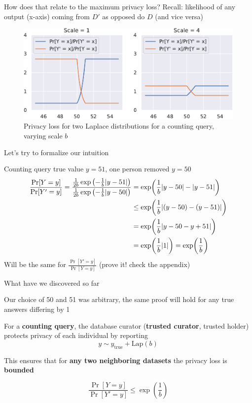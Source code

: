 \documentclass[12pt,aspectratio=169,handout]{beamer}
\begin{document}
\begin{frame}{How does that relate to the maximum privacy loss?}
Recall: likelihood of any output (x-axis) coming from $D'$ as opposed do $D$ (and vice versa)

\begin{figure}
\centering
\includegraphics[width=0.8\linewidth]{img/privacy-loss1.pdf}
\caption{Privacy loss for two Laplace distributions for a counting query, varying scale $b$}
\end{figure}

\end{frame}



\begin{frame}{Let's try to formalize our intuition}
\label{slide:proof.reference}

Counting query true value $y= 51$, one person removed $y = 50$
$$
\begin{aligned}
\frac{\Pr[Y = y]}{\Pr[Y' = y]} =
\frac{
\frac{1}{2b} \exp \left(- \frac{1}{b} \abs{y - 51} \right)
}{
\frac{1}{2b} \exp \left(- \frac{1}{b} \abs{y - 50} \right) 
}
&= \exp (\frac{1}{b} \abs{y - 50} - \abs{y - 51} ) \\
&\leq \exp (\frac{1}{b} \abs{(y - 50) - (y - 51)} ) \\
&= \exp (\frac{1}{b} \abs{y - 50 - y + 51} ) \\
&= \exp (\frac{1}{b} \abs{1}) = \exp(\frac{1}{b}) \\
\end{aligned}
$$
Will be the same for $\frac{\Pr[Y' = y]}{\Pr[Y = y]}$ (prove it! check the appendix)

\end{frame}







\begin{frame}{What have we discovered so far}

Our choice of 50 and 51 was arbitrary, the same proof will hold for any true answers differing by 1

For a \textbf{counting query}, the database curator (\textbf{trusted curator}, trusted holder) protects privacy of each individual by reporting
$$y \sim y_{\mathrm{true}} + \textrm{Lap}(b)$$

This ensures that for \textbf{any two neighboring datasets} the privacy loss is \textbf{bounded}

$$
\frac{\Pr[Y = y]}{\Pr[Y' = y]} \leq \exp(\frac{1}{b})
$$

\end{frame}
\end{document}
